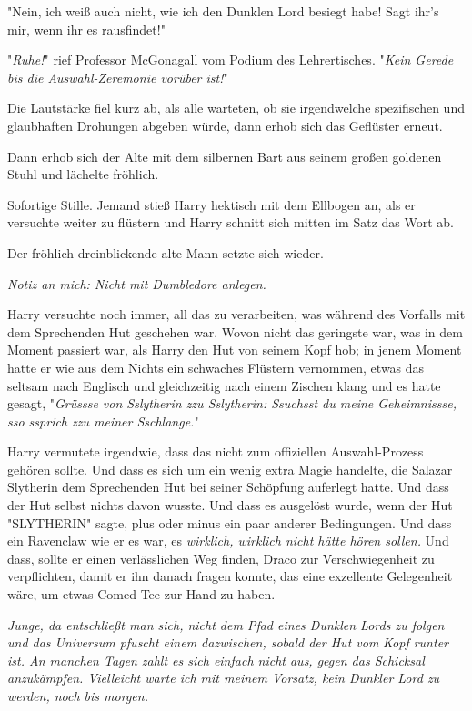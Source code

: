 {"Nein, ich weiß auch nicht, wie ich den Dunklen Lord besiegt habe! Sagt ihr's mir, wenn ihr es rausfindet!"

"\emph{Ruhe!}" rief Professor McGonagall vom Podium des Lehrertisches. "\emph{Kein Gerede bis die Auswahl-Zeremonie vorüber ist!}"

Die Lautstärke fiel kurz ab, als alle warteten, ob sie irgendwelche spezifischen und glaubhaften Drohungen abgeben würde, dann erhob sich das Geflüster erneut.

Dann erhob sich der Alte mit dem silbernen Bart aus seinem großen goldenen Stuhl und lächelte fröhlich.

Sofortige Stille. Jemand stieß Harry hektisch mit dem Ellbogen an, als er versuchte weiter zu flüstern und Harry schnitt sich mitten im Satz das Wort ab.

Der fröhlich dreinblickende alte Mann setzte sich wieder.

\emph{Notiz an mich: Nicht mit Dumbledore anlegen.}

Harry versuchte noch immer, all das zu verarbeiten, was während des Vorfalls mit dem Sprechenden Hut geschehen war. Wovon nicht das geringste war, was in dem Moment passiert war, als Harry den Hut von seinem Kopf hob; in jenem Moment hatte er wie aus dem Nichts ein schwaches Flüstern vernommen, etwas das seltsam nach Englisch und gleichzeitig nach einem Zischen klang und es hatte gesagt, "\emph{Grüssse von Sslytherin zzu Sslytherin: Ssuchsst du meine Geheimnissse, sso ssprich zzu meiner Sschlange.}"

Harry vermutete irgendwie, dass das nicht zum offiziellen Auswahl-Prozess gehören sollte. Und dass es sich um ein wenig extra Magie handelte, die Salazar Slytherin dem Sprechenden Hut bei seiner Schöpfung auferlegt hatte. Und dass der Hut selbst nichts davon wusste. Und dass es ausgelöst wurde, wenn der Hut "SLYTHERIN" sagte, plus oder minus ein paar anderer Bedingungen. Und dass ein Ravenclaw wie er es war, es \emph{wirklich, wirklich nicht hätte hören sollen.} Und dass, sollte er einen verlässlichen Weg finden, Draco zur Verschwiegenheit zu verpflichten, damit er ihn danach fragen konnte, das eine exzellente Gelegenheit wäre, um etwas Comed-Tee zur Hand zu haben.

\emph{Junge, da entschließt man sich, nicht dem Pfad eines Dunklen Lords zu folgen und das Universum pfuscht einem dazwischen, sobald der Hut vom} \emph{Kopf runter ist. An manchen Tagen zahlt es sich einfach nicht aus, gegen das Schicksal anzukämpfen. Vielleicht warte ich mit meinem Vorsatz, kein Dunkler Lord zu werden, noch bis morgen.}

}
